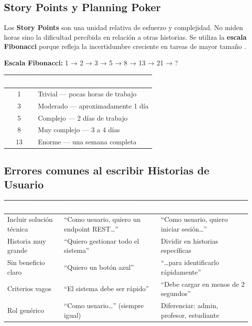 \documentclass[12pt, a4paper]{article}
\begin{document}
\subsection{Story Points y Planning Poker}

Los \textbf{Story Points} son una unidad relativa de esfuerzo y complejidad.
No miden horas sino la dificultad percibida en relación a otras historias.
Se utiliza la \textbf{escala Fibonacci} porque refleja la incertidumbre
creciente en tareas de mayor tamaño \parencite{cohn2004}.

\begin{formulabox}
  \textbf{Escala Fibonacci:} 1 → 2 → 3 → 5 → 8 → 13 → 21 → ?

  \vspace{0.3cm}
  \begin{tabular}{cp{9cm}}
    \toprule
    \rowcolor{espeazul}
    \textcolor{white}{\textbf{Puntos}} & \textcolor{white}{\textbf{Interpretación}} \\
    \midrule
    1  & Trivial — pocas horas de trabajo \\
    3  & Moderado — aproximadamente 1 día \\
    5  & Complejo — 2 días de trabajo \\
    8  & Muy complejo — 3 a 4 días \\
    13 & Enorme — una semana completa \\
    \bottomrule
  \end{tabular}
\end{formulabox}

\subsection{Errores comunes al escribir Historias de Usuario}

\begin{tabular}{p{3cm} p{5cm} p{5cm}}
  \toprule
  \rowcolor{espeazul}
  \textcolor{white}{\textbf{Error}} & \textcolor{white}{\textbf{Ejemplo incorrecto}} & \textcolor{white}{\textbf{Corrección}} \\
  \midrule
  Incluir solución técnica & ``Como usuario, quiero un endpoint REST\ldots'' & ``Como usuario, quiero iniciar sesión\ldots'' \\
  Historia muy grande      & ``Quiero gestionar todo el sistema''            & Dividir en historias específicas \\
  Sin beneficio claro      & ``Quiero un botón azul''                        & ``\ldots para identificarlo rápidamente'' \\
  Criterios vagos          & ``El sistema debe ser rápido''                  & ``Debe cargar en menos de 2 segundos'' \\
  Rol genérico             & ``Como usuario\ldots'' (siempre igual)          & Diferenciar: admin, profesor, estudiante \\
  \bottomrule
\end{tabular}
\end{document}

